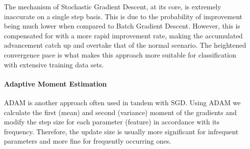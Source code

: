		\par
		
		The mechanism of Stochastic Gradient Descent, at its core, is extremely inaccurate on a single step basis. This is due to the probability of improvement being much lower when compared to Batch Gradient Descent. However, this is compensated for with a more rapid improvement rate, making the accumulated advancement catch up and overtake that of the normal scenario. The heightened convergence pace is what makes this approach more suitable for classification with extensive training data sets.
		
	\paragraph{Adaptive Moment Estimation}
		ADAM is another approach often used in tandem with SGD. Using ADAM we calculate the first (mean) and second (variance) moment of the gradients and modify the step size for each parameter (feature) in accordance with its frequency. Therefore, the update size is usually more significant for infrequent parameters and more fine for frequently occurring ones.
			
		 

				
				